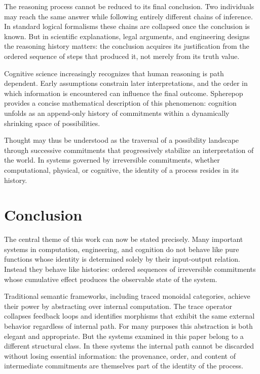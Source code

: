\documentclass[12pt]{article}
\begin{document}
The reasoning process cannot be reduced to its final conclusion. Two individuals may reach the same answer while following entirely different chains of inference. In standard logical formalisms these chains are collapsed once the conclusion is known. But in scientific explanations, legal arguments, and engineering designs the reasoning history matters: the conclusion acquires its justification from the ordered sequence of steps that produced it, not merely from its truth value.

Cognitive science increasingly recognizes that human reasoning is path dependent. Early assumptions constrain later interpretations, and the order in which information is encountered can influence the final outcome. Spherepop provides a concise mathematical description of this phenomenon: cognition unfolds as an append-only history of commitments within a dynamically shrinking space of possibilities.

Thought may thus be understood as the traversal of a possibility landscape through successive commitments that progressively stabilize an interpretation of the world. In systems governed by irreversible commitments, whether computational, physical, or cognitive, the identity of a process resides in its history.

\section{Conclusion}
\label{sec:conclusion}

The central theme of this work can now be stated precisely. Many important systems in computation, engineering, and cognition do not behave like pure functions whose identity is determined solely by their input-output relation. Instead they behave like histories: ordered sequences of irreversible commitments whose cumulative effect produces the observable state of the system.

Traditional semantic frameworks, including traced monoidal categories, achieve their power by abstracting over internal computation. The trace operator collapses feedback loops and identifies morphisms that exhibit the same external behavior regardless of internal path. For many purposes this abstraction is both elegant and appropriate. But the systems examined in this paper belong to a different structural class. In these systems the internal path cannot be discarded without losing essential information: the provenance, order, and content of intermediate commitments are themselves part of the identity of the process.
\end{document}
